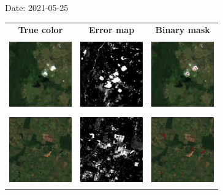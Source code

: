 \documentclass{beamer}
\begin{document}
\begin{frame}{Date: 2021-05-25}
    \begin{tabular}{ccc}
        \textbf{True color} & \textbf{Error map} & \textbf{Binary mask}\\
        \includegraphics[width=2.7cm,height=3cm]{Figures/v6/20210525/TCI_zoom3.png}& \includegraphics[width=2.7cm,height=3cm]{Figures/v6/20210525/error_map_zoom3.png} &\includegraphics[width=2.7cm,height=3cm]{Figures/v6/20210525/zoom3_BI.png}\\
        \includegraphics[width=2.7cm,height=3cm]{Figures/v6/20210525/TCI_zoom4.png}& \includegraphics[width=2.7cm,height=3cm]{Figures/v6/20210525/error_map_zoom4.png} &\includegraphics[width=2.7cm,height=3cm]{Figures/v6/20210525/zoom4_BI.png}\\
        \end{tabular}
\end{frame}
\end{document}
